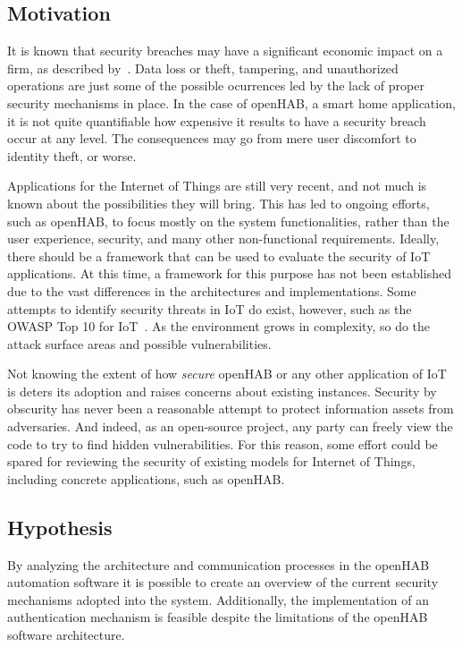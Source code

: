 \documentclass[12pt]{article}
\begin{document}
\subsection{Motivation}

It is known that security breaches may have a significant economic impact on a firm, as described by~\cite{GOEL}. Data loss or theft, tampering, and unauthorized operations are just some of the possible ocurrences led by the lack of proper security mechanisms in place. In the case of openHAB, a smart home application, it is not quite quantifiable how expensive it results to have a security breach occur at any level. The consequences may go from mere user discomfort to identity theft, or worse.

Applications for the Internet of Things are still very recent, and not much is known about the possibilities they will bring. This has led to ongoing efforts, such as openHAB, to focus mostly on the system functionalities, rather than the user experience, security, and many other non-functional requirements. Ideally, there should be a framework that can be used to evaluate the security of IoT applications. At this time, a framework for this purpose has not been established due to the vast differences in the architectures and implementations. Some attempts to identify security threats in IoT do exist, however, such as the OWASP Top 10 for IoT~\cite{owasp}. As the environment grows in complexity, so do the attack surface areas and possible vulnerabilities.

Not knowing the extent of how \emph{secure} openHAB or any other application of IoT is deters its adoption and raises concerns about existing instances. Security by obscurity has never been a reasonable attempt to protect information assets from adversaries. And indeed, as an open-source project, any party can freely view the code to try to find hidden vulnerabilities. For this reason, some effort could be spared for reviewing the security of existing models for Internet of Things, including concrete applications, such as openHAB.

\subsection{Hypothesis}

By analyzing the architecture and communication processes in the openHAB automation software it is possible to create an overview of the current security mechanisms adopted into the system. Additionally, the implementation of an authentication mechanism is feasible despite the limitations of the openHAB software architecture.
\end{document}

